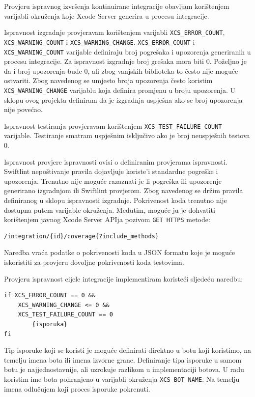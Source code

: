 \documentclass[times, utf8, diplomski, numeric]{fer}
\begin{document}
Provjeru ispravnog izvršenja kontinuirane integracije obavljam korištenjem varijabli okruženja koje Xcode Server generira u procesu integracije.

Ispravnost izgradnje provjeravam korištenjem varijabli \verb|XCS_ERROR_COUNT|, \\ \verb|XCS_WARNING_COUNT| i \verb|XCS_WARNING_CHANGE|. \verb|XCS_ERROR_COUNT| i \\ \verb|XCS_WARNING_COUNT| varijable definiraju broj pogrešaka i upozorenja generiranih u procesu integracije. Za ispravnost izgradnje broj grešaka mora biti 0. Poželjno je da i broj upozorenja bude 0, ali zbog vanjskih biblioteka to često nije moguće ostvariti. Zbog navedenog se umjesto broja upozorenja često koristim \verb|XCS_WARNING_CHANGE| varijablu koja definira promjenu u broju upozorenja. U sklopu ovog projekta definiram da je izgradnja uspješna ako se broj upozorenja nije povećao.

Ispravnost testiranja provjeravam korištenjem \verb|XCS_TEST_FAILURE_COUNT| varijable. Testiranje smatram uspješnim isključivo ako je broj neuspješnih testova 0.

Ispravnost provjere ispravnosti ovisi o definiranim provjerama ispravnosti. Swiftlint nepoštivanje pravila dojavljuje koriste'i standardne pogreške i upozorenja. Trenutno nije moguće razaznati je li pogreška ili upozorenje generirano izgradnjom ili Swiftlint provjerom. Zbog navedenog se držim pravila definiranog u sklopu ispravnosti izgradnje. Pokrivenost koda trenutno nije dostupna putem varijable okruženja. Međutim, moguće ju je dohvatiti korištenjem javnog Xcode Server APIja pozivom \verb|GET HTTPS| metode:

\begin{verbatim}
/integration/{id}/coverage{?include_methods}
\end{verbatim}

Naredba vraća podatke o pokrivenosti koda u JSON formatu koje je moguće iskoristiti za provjeru dovoljne pokrivenosti koda testovima.

Provjeru ispravnost cijele integracije implementiram koristeći sljedeću naredbu:

\begin{verbatim}
if XCS_ERROR_COUNT == 0 &&
    XCS_WARNING_CHANGE <= 0 &&
    XCS_TEST_FAILURE_COUNT == 0
        {isporuka}
fi
\end{verbatim}

Tip isporuke koji se koristi je moguće definirati direktno u botu koji koristimo, na temelju imena bota ili imena izvorne grane. Definiranje tipa isporuke u samom botu je najjednostavnije, ali uzrokuje razlikom u implementaciji botova. U radu koristim ime bota pohranjeno u varijabli okruženja \verb|XCS_BOT_NAME|. Na temelju imena odlučujem koji proces isporuke pokrenuti.
\end{document}
